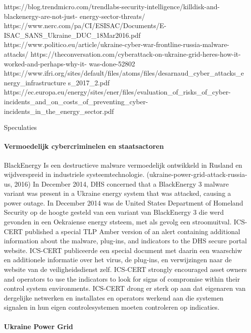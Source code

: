 {https://blog.trendmicro.com/trendlabs-security-intelligence/killdisk-and-blackenergy-are-not-just-
energy-sector-threats/
https://www.nerc.com/pa/CI/ESISAC/Documents/E-ISAC_SANS_Ukraine_DUC_18Mar2016.pdf
https://www.politico.eu/article/ukraine-cyber-war-frontline-russia-malware-attacks/
https://theconversation.com/cyberattack-on-ukraine-grid-heres-how-it-worked-and-perhaps-why-it-
was-done-52802
https://www.ifri.org/sites/default/files/atoms/files/desarnaud_cyber_attacks_energy_infrastructure
s_2017_2.pdf
https://ec.europa.eu/energy/sites/ener/files/evaluation_of_risks_of_cyber-
incidents_and_on_costs_of_preventing_cyber-incidents_in_the_energy_sector.pdf

Speculaties


 \paragraph{Vermoedelijk cybercriminelen en staatsactoren}
BlackEnergy
Is een destructieve malware vermoedelijk ontwikkeld in Rusland en wijdverspreid in industriele
systeemtechnologie. (ukraine-power-grid-attack-russia-us, 2016)
In December 2014, DHS concerned that a BlackEnergy 3 malware variant was present in a
Ukraine energy system that was attacked, causing a power outage. In December 2014 was
de United States Department of Homeland Security op de hoogte gesteld van een variant
van BlackEnergy 3 die werd gevonden in een Oekraiense energy ststeem, met als gevolg
een stroomuitval.
ICS-CERT published a special TLP Amber version of an alert containing additional
information about the malware, plug-ins, and indicators to the DHS secure portal website.
ICS-CERT publiceerde een special document met daarin een waarschiw en additionele
informatie over het virus, de plug-ins, en verwijzingen naar de website van de
veiligheidsdienst zelf.
ICS-CERT strongly encouraged asset owners and operators to use the indicators to look for
signs of compromise within their control system environments. ICS-CERT drong er sterk op
aan dat eigenaren van dergelijke netwerken en installates en operators werkend aan die
systemen signalen in hun eigen controlesystemen moeten controleren op indicaties.
 \paragraph{Ukraine Power Grid}

}
